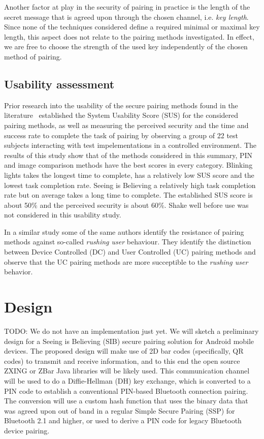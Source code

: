 \documentclass[conference, 11pt]{sty/IEEEtran}
\begin{document}
Another factor at play in the security of pairing in practice is the length of the secret message that is agreed upon through the chosen channel, i.e. \emph{key length}.
Since none of the techniques considered define a required minimal or maximal key length, this aspect does not relate to the pairing methods investigated.
In effect, we are free to choose the strength of the used key independently of the chosen method of pairing.

\subsection{Usability assessment}
\label{ssec:usability_assessment}

Prior research into the usability of the secure pairing methods found in the literature~\cite{kumar2009comparative} established the System Usability Score (SUS) for the considered pairing methods, as well as measuring the perceived security and the time and success rate to complete the task of pairing by observing a group of 22 test subjects interacting with test impelementations in a controlled environment.
The results of this study show that of the methods considered in this summary, PIN and image comparison methods have the best scores in every category.
Blinking lights takes the longest time to complete, has a relatively low SUS score and the lowest task completion rate.
Seeing is Believing a relatively high task completion rate but on average takes a long time to complete.
The established SUS score is about 50\% and the perceived security is about 60\%.
Shake well before use was not considered in this usability study.

In a similar study \cite{kobsa2009serial} some of the same authors identify the resistance of pairing methods against so-called \textit{rushing user} behaviour.
They identify the distinction between Device Controlled (DC) and User Controlled (UC) pairing methods and observe that the UC pairing methods are more succeptible to the \textit{rushing user} behavior.

\section{Design}
\label{sec:implementation}

TODO: We do not have an implementation just yet.
We will sketch a preliminary design for a Seeing is Believing (SIB) secure pairing solution for Android mobile devices.
The proposed design will make use of 2D bar codes (specifically, QR codes) to transmit and receive information, and to this end the open source ZXING or ZBar Java libraries will be likely used.
This communication channel will be used to do a Diffie-Hellman (DH) key exchange, which is converted to a PIN code to establish a conventional PIN-based Bluetooth connection pairing.
The conversion will use a custom hash function that uses the binary data that was agreed upon out of band in a regular Simple Secure Pairing (SSP) for Bluetooth 2.1 and higher, or used to derive a PIN code for legacy Bluetooth device pairing.
\end{document}
